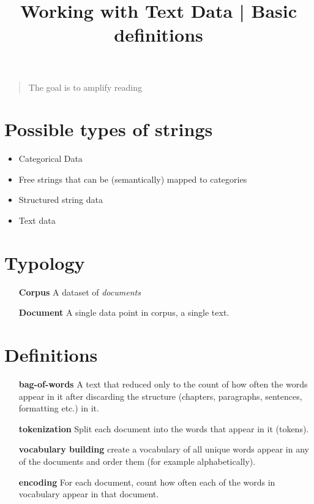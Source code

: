 \documentclass[nobib]{tufte-handout}
\begin{document}
\title{Working with Text Data | Basic definitions}
\maketitle

\blockquote{The goal is to amplify reading}
\section{Possible types of strings}%
\label{sec:possible_types_of_strings}

\begin{itemize}
    \item Categorical Data

    \item Free strings that can be (semantically) mapped to categories

    \item Structured string data

    \item Text data
\end{itemize}


\section{Typology}%
\label{sec:typology}

\begin{itemize}
    \item [\textbf{Corpus}] A dataset of \textit{documents}

    \item [\textbf{Document}] A single data point in corpus, a single text.
\end{itemize}

\section{Definitions}%
\label{sec:definitions}

\begin{itemize}
    \item [ \textbf{bag-of-words}] A text that reduced only to the count of how often the words appear in it after discarding the structure (chapters, paragraphs, sentences, formatting etc.) in it.

    \item [\textbf{tokenization}] Split each document into the words that appear in it (tokens).

    \item [\textbf{vocabulary building}] create a vocabulary of all unique words appear in any of the documents and order them (for example alphabetically).

    \item [\textbf{encoding}] For each document, count how often each of the words in vocabulary appear in that document.
\end{itemize}
\end{document}
